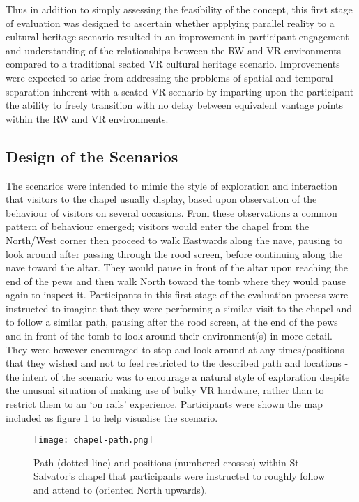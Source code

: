 Thus in addition to simply assessing the feasibility of the concept, this first stage of evaluation was designed to ascertain whether applying parallel reality to a cultural heritage scenario resulted in an improvement in participant engagement and understanding of the relationships between the RW and VR environments compared to a traditional seated VR cultural heritage scenario. Improvements were expected to arise from addressing the problems of spatial and temporal separation inherent with a seated VR scenario by imparting upon the participant the ability to freely transition with no delay between equivalent vantage points within the RW and VR environments.


\subsection{Design of the Scenarios}

The scenarios were intended to mimic the style of exploration and interaction that visitors to the chapel usually display, based upon observation of the behaviour of visitors on several occasions. From these observations a common pattern of behaviour emerged; visitors would enter the chapel from the North/West corner then proceed to walk Eastwards along the nave, pausing to look around after passing through the rood screen, before continuing along the nave toward the altar. They would pause in front of the altar upon reaching the end of the pews and then walk North toward the tomb where they would pause again to inspect it. Participants in this first stage of the evaluation process were instructed to imagine that they were performing a similar visit to the chapel and to follow a similar path, pausing after the rood screen, at the end of the pews and in front of the tomb to look around their environment(s) in more detail. They were however encouraged to stop and look around at any times/positions that they wished and not to feel restricted to the described path and locations - the intent of the scenario was to encourage a natural style of exploration despite the unusual situation of making use of bulky VR hardware, rather than to restrict them to an `on rails' experience. Participants were shown the map included as figure \ref{chapel-path} to help visualise the scenario.

\begin{figure}
	\begin{center}
		\texttt{[image: chapel-path.png]}
		\caption{Path (dotted line) and positions (numbered crosses) within St Salvator's chapel that participants were instructed to roughly follow and attend to (oriented North upwards).}
		\label{chapel-path}
	\end{center}
\end{figure}

